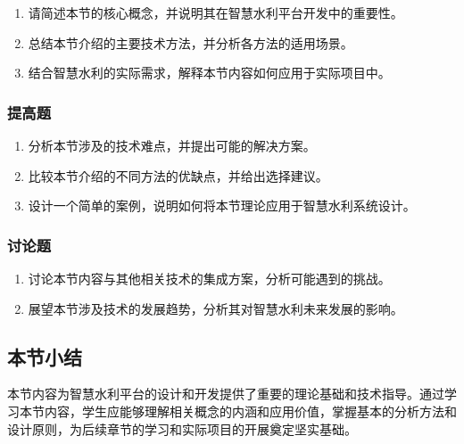 \begin{enumerate} \def\labelenumi{\arabic{enumi}.} \item 请简述本节的核心概念，并说明其在智慧水利平台开发中的重要性。 \item 总结本节介绍的主要技术方法，并分析各方法的适用场景。 \item 结合智慧水利的实际需求，解释本节内容如何应用于实际项目中。 \end{enumerate} \subsubsection{提高题}\label{ux63d0ux9ad8ux9898} \begin{enumerate} \def\labelenumi{\arabic{enumi}.} \setcounter{enumi}{3} \item 分析本节涉及的技术难点，并提出可能的解决方案。 \item 比较本节介绍的不同方法的优缺点，并给出选择建议。 \item 设计一个简单的案例，说明如何将本节理论应用于智慧水利系统设计。 \end{enumerate} \subsubsection{讨论题}\label{ux8ba8ux8bbaux9898} \begin{enumerate} \def\labelenumi{\arabic{enumi}.} \setcounter{enumi}{6} \item 讨论本节内容与其他相关技术的集成方案，分析可能遇到的挑战。 \item 展望本节涉及技术的发展趋势，分析其对智慧水利未来发展的影响。 \end{enumerate} \subsection{本节小结}\label{ux672cux8282ux5c0fux7ed3} 本节内容为智慧水利平台的设计和开发提供了重要的理论基础和技术指导。通过学习本节内容，学生应能够理解相关概念的内涵和应用价值，掌握基本的分析方法和设计原则，为后续章节的学习和实际项目的开展奠定坚实基础。

